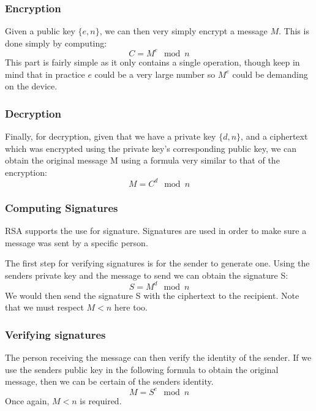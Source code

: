 \documentclass[conference]{IEEEtran}
\begin{document}
\subsubsection{Encryption}
Given a public key $\{e,n\}$, we can then very simply encrypt a message $M$.
This is done simply by computing:
\begin{equation*}
    C = M^{e}\mod n
\end{equation*}
This part is fairly simple as it only contains a single operation, though keep in mind that
in practice $e$ could be a very large number so $M^{e}$ could be demanding on the device.


\subsubsection{Decryption}
Finally, for decryption, given that we have a private key $\{d,n\}$, and a ciphertext
which was encrypted using the private key's corresponding public key, we can obtain the original
message M using a formula very similar to that of the encryption:
\begin{equation*}
    M = C^{d}\mod n
\end{equation*}


\subsubsection{Computing Signatures}
RSA supports the use for signature. Signatures are used in order to make 
sure a message was sent by a specific person.

The first step for verifying signatures is for the sender to generate one.
Using the senders private key and the message to send we can obtain the signature
S:
\begin{equation*}
    S = M^{d}\mod n
\end{equation*}
We would then send the signature S with the ciphertext to the recipient.
Note that we must respect $M < n$ here too.


\subsubsection{Verifying signatures}
The person receiving the message can then verify the identity of the sender.
If we use the senders public key in the following formula to obtain the original
message, then we can be certain of the senders identity.
\begin{equation*}
    M = S^{e}\mod n
\end{equation*}
Once again, $M < n$ is required.
\end{document}
